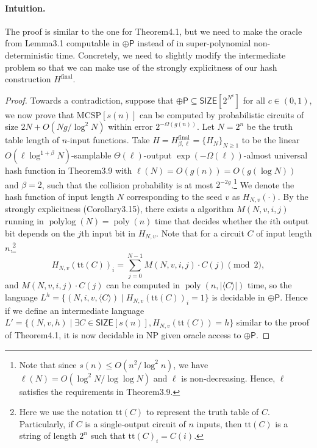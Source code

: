 \documentclass[10pt,a4paper]{article}
\begin{document}
\paragraph{Intuition.} The proof is similar to the one for Theorem4.1, but we need to make the oracle from Lemma3.1 computable in $\oplus\mathsf P$ instead of in super-polynomial non-deterministic time. Concretely, we need to slightly modify the intermediate problem so that we can make use of the strongly explicitness of our hash construction $H^{\mathrm{final}}$.
\begin{proof}
Towards a contradiction, suppose that $\oplus\mathsf P\subseteq\mathsf{SIZE}[2^{N^c}]$ for all $c\in(0,1)$, we now prove that $\mathrm{MCSP}[s(n)]$ can be computed by probabilistic circuits of size $2N+O(Ng/\log^2N)$ within error $2^{-\Omega(g(n))}$.
Let $N=2^n$ be the truth table length of $n$-input functions. Take $H=H^{\mathrm{final}}_{\beta,\ell}=\{H_N\}_{N\ge1}$ to be the linear $O(\ell\log^{1+\beta}N)$-samplable $\Theta(\ell)$-output $\exp(-\Omega(\ell))$-almost universal hash function in Theorem3.9 with $\ell(N)=O(g(n))=O(g(\log N))$ and $\beta=2$, such that the collision probability is at most $2^{-2g}$.\footnote{Note that since $s(n)\le O(n^2/\log^2n)$, we have $\ell(N)=O(\log^2N/\log\log N)$ and $\ell$ is non-decreasing. Hence, $\ell$ satisfies the requirements in Theorem3.9.}
We denote the hash function of input length $N$ corresponding to the seed $v$ as $H_{N,v}(\cdot)$. By the strongly explicitness (Corollary3.15), there exists a algorithm $M(N,v,i,j)$ running in $\operatorname{polylog}(N)=\operatorname{poly}(n)$ time that decides whether the $i$th output bit depends on the $j$th input bit in $H_{N,v}$. Note that for a circuit $C$ of input length $n$,\footnote{Here we use the notation $\mathrm{tt}(C)$ to represent the truth table of $C$. Particularly, if $C$ is a single-output circuit of $n$ inputs, then $\mathrm{tt}(C)$ is a string of length $2^n$ such that $\mathrm{tt}(C)_i=C(i)$.}
\[H_{N,v}(\mathrm{tt}(C))_i=\sum_{j=0}^{N-1}M(N,v,i,j)\cdot C(j)\pmod2,\]
and $M(N,v,i,j)\cdot C(j)$ can be computed in $\operatorname{poly}(n,|\langle C\rangle|)$ time, so the language $L^h=\{(N,i,v,\langle C\rangle)\mid H_{N,v}(\mathrm{tt}(C))_i=1\}$ is decidable in $\oplus\mathsf P$. Hence if we define an intermediate language $L'=\{(N,v,h)\mid\exists C\in\mathsf{SIZE}[s(n)],H_{N,v}(\mathrm{tt}(C))=h\}$ similar to the proof of Theorem4.1, it is now decidable in NP given oracle access to $\oplus\mathsf P$.

\end{proof}
\end{document}
